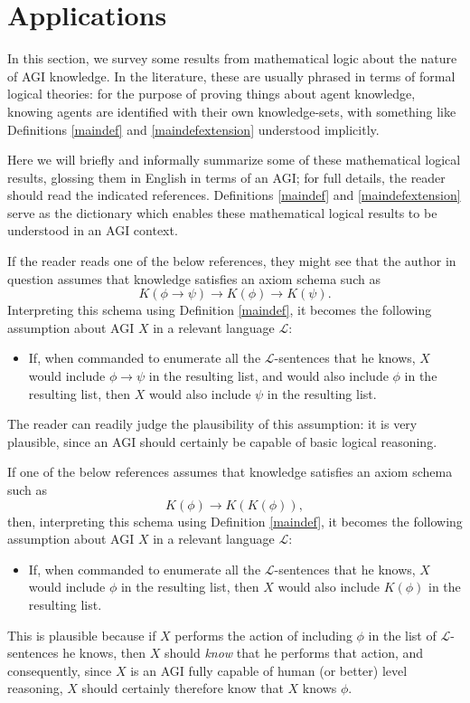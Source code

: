 \documentclass[runningheads]{llncs}
\begin{document}
\section{Applications}
\label{appsection}

In this section, we survey some results from mathematical logic about the nature
of AGI knowledge. In the literature, these are usually phrased in terms of
formal logical theories: for the purpose of proving things about agent knowledge,
knowing agents are identified with their own knowledge-sets,
with something like Definitions \ref{maindef} and \ref{maindefextension} understood
implicitly.

Here we will briefly and informally summarize some of these mathematical
logical results, glossing them in English in terms of an AGI; for full details,
the reader should read the indicated references. Definitions \ref{maindef}
and \ref{maindefextension} serve as the dictionary which enables these mathematical
logical results to be understood in an AGI context.

\begin{example}
If the reader
reads one of the below references, they might see that the author in question
assumes that knowledge satisfies an axiom schema such as
\[K(\phi\rightarrow\psi)\rightarrow K(\phi)\rightarrow K(\psi).\]
Interpreting this schema using Definition \ref{maindef}, it becomes the following
assumption about AGI $X$ in a relevant language $\mathscr L$:
\begin{itemize}
  \item
  If, when commanded to enumerate all the $\mathscr L$-sentences that he knows,
  $X$ would include $\phi\rightarrow\psi$ in the resulting list, and would also
  include $\phi$ in the resulting list, then $X$ would also include $\psi$ in
  the resulting list.
\end{itemize}
The reader can readily judge the plausibility of this assumption: it is very plausible,
since an AGI should certainly be capable of basic logical reasoning.
\end{example}

\begin{example}
  If one of the below references assumes that knowledge satisfies an axiom schema
  such as
  \[
    K(\phi)\rightarrow K(K(\phi)),
  \]
  then, interpreting this schema using Definition \ref{maindef}, it becomes
  the following assumption about AGI $X$ in a relevant language $\mathscr L$:
  \begin{itemize}
    \item
    If, when commanded to enumerate all the $\mathscr L$-sentences that he knows,
    $X$ would include $\phi$ in the resulting list, then $X$ would also include
    $K(\phi)$ in the resulting list.
  \end{itemize}
  This is plausible because if $X$ performs the action of including $\phi$ in the
  list of $\mathscr L$-sentences he knows, then $X$ should \emph{know} that he
  performs that action, and consequently, since $X$ is an AGI fully capable of
  human (or better) level reasoning, $X$ should certainly therefore know that $X$
  knows $\phi$.
\end{example}
\end{document}
